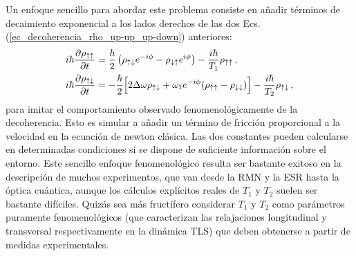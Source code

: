 \documentclass[a4paper,11pt]{book} %
\numberwithin{equation}{chapter}
\def\lp{\left(}
\def\rp{\right)}
\def\Lc{\Bigl[}
\def\Rc{\Bigr]}
\begin{document}
Un enfoque sencillo para abordar este problema consiste en añadir términos de decaimiento exponencial a los lados derechos de las dos Ecs. (\ref{ec_decoherencia_rho_up-up_up-down})  anteriores:
	\begin{equation} \label{ec_decoherencia_rho_up-up_up-down_ficcion} 
	\begin{aligned}
	i \hbar \frac{\partial \rho_{\uparrow \uparrow}}{\partial t} & = \frac{\hbar}{2} \lp \rho_{\uparrow \downarrow} e^{-i \phi} - \rho_{\downarrow \uparrow} e^{i \phi} \rp - \frac{i \hbar}{T_1} \rho_{\uparrow \uparrow} \, , \\
	i \hbar \frac{\partial \rho_{\uparrow \downarrow}}{\partial t} & = 
	- \frac{\hbar}{2} \Lc 2 \Delta \omega \rho_{\uparrow \downarrow} + 
	\omega_1 e^{-i \phi} (\rho_{\uparrow \uparrow} - \rho_{\downarrow \downarrow}) \Rc - \frac{i \hbar}{T_2}  \rho_{\uparrow \downarrow} \, , 
	\end{aligned}
	\end{equation}
para imitar el comportamiento observado fenomenológicamente de la decoherencia. Esto es simular a añadir un término de fricción proporcional a la velocidad en la ecuación de newton clásica. Las dos constantes pueden calcularse en determinadas condiciones si se dispone de suficiente información sobre el entorno. Este sencillo enfoque fenomenológico resulta ser bastante exitoso en la descripción de muchos experimentos, que van desde la RMN y la ESR hasta la óptica cuántica, aunque los cálculos explícitos reales de $T_1$ y $T_2$ suelen ser bastante difíciles. Quizás sea más fructífero considerar $T_1$ y $T_2$ como parámetros puramente fenomenológicos (que caracterizan las relajaciones longitudinal y transversal respectivamente en la dinámica TLS) que deben obtenerse a partir de medidas experimentales.
\end{document}
